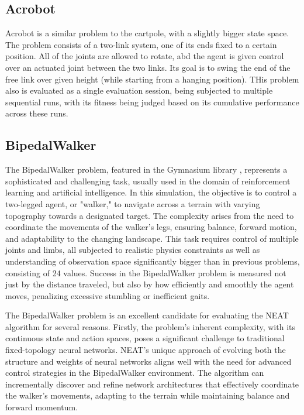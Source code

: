\documentclass{article}
\begin{document}
        \subsection{Acrobot}
        Acrobot is a similar problem to the cartpole, with a slightly bigger state space. The problem consists
        of a two-link system, one of its ends fixed to a certain position. All of the joints are allowed to rotate,
        abd the agent is given control over an actuated joint between the two links. Its goal is to swing the
        end of the free link over given height (while starting from a hanging position). 
        THis problem also is evaluated as a single evaluation session, being subjected to multiple sequential runs,
        with its fitness being judged based on its cumulative performance across these runs.
        \subsection{BipedalWalker}
        The BipedalWalker problem, featured in the Gymnasium library \cite{gymnasium},
        represents a sophisticated and challenging task, usually used in the domain of reinforcement learning and artificial intelligence.
        In this simulation, the objective is to control a two-legged agent, or "walker," to navigate
        across a terrain with varying topography towards a designated target. The complexity arises from the
        need to coordinate the movements of the walker's legs, ensuring balance, forward motion, and adaptability to the changing landscape.
        This task requires control of multiple joints and limbs, all subjected to realistic physics constraints as well as understanding
        of observation space significantly bigger than in previous problems, consisting of 24 values.
        Success in the BipedalWalker problem is measured not just by the distance traveled,
        but also by how efficiently and smoothly the agent moves, penalizing excessive stumbling or inefficient gaits.

        \par The BipedalWalker problem is an excellent candidate for evaluating the NEAT
        algorithm for several reasons. Firstly, the problem's inherent complexity, with its continuous state and action spaces,
        poses a significant challenge to traditional fixed-topology neural networks.
        NEAT's unique approach of evolving both the structure and weights of neural networks aligns well with the need 
        for advanced control strategies in the BipedalWalker environment. The algorithm can 
        incrementally discover and refine network architectures that effectively coordinate the walker's
        movements, adapting to the terrain while maintaining balance and forward momentum.
\end{document}
